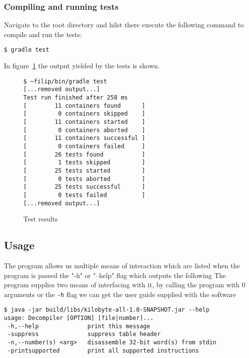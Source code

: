 \subsubsection{Compiling and running tests}

Navigate to the root directory and hilst there execute the following
command to compile and run the tests:

\begin{verbatim}
$ gradle test
\end{verbatim}

In figure~\ref{fig:tests} the output yielded by the tests is shown.

\begin{landscape}
\thispagestyle{empty}
\cfoot{}
\begin{figure}[htpb]
\begin{lstlisting}[style=plain]
$ ~filip/bin/gradle test             
[...removed output...]
Test run finished after 258 ms
[        11 containers found      ]
[         0 containers skipped    ]
[        11 containers started    ]
[         0 containers aborted    ]
[        11 containers successful ]
[         0 containers failed     ]
[        26 tests found           ]
[         1 tests skipped         ]
[        25 tests started         ]
[         0 tests aborted         ]
[        25 tests successful      ]
[         0 tests failed          ]
[...removed output...]
\end{lstlisting}
\caption{Test results}
\label{fig:tests}
\end{figure}
\end{landscape}

\subsection{Usage}

The program allows us multiple means of interaction which are listed
when the program is passed the "-h" or "--help" flag which outputs the following
The program supplies two means of interfacing with it, by calling
the program with 0 arguments or the \texttt{-h} flag we can get the
user guide supplied with the software

\begin{lstlisting}[style=plain]
$ java -jar build/libs/kilobyte-all-1.0-SNAPSHOT.jar --help
usage: Decompiler [OPTION] [file|number]...
 -h,--help              print this message
 -suppress              suppress table header
 -n,--number(s) <arg>   disassemble 32-bit word(s) from stdin
 -printsupported        print all supported instructions
\end{lstlisting}

